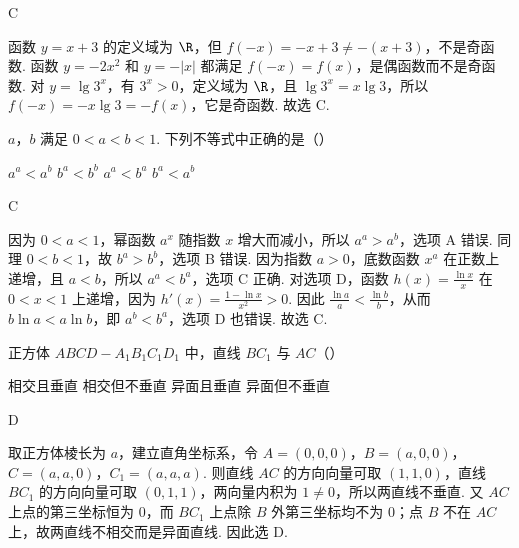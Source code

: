 \begin{answer}
C
\end{answer}

\begin{solution}
函数 \(y=x+3\) 的定义域为 \(\R\)，但 \(f(-x)=-x+3\neq-(x+3)\)，不是奇函数. 函数 \(y=-2x^2\) 和 \(y=-|x|\) 都满足 \(f(-x)=f(x)\)，是偶函数而不是奇函数. 对 \(y=\lg 3^x\)，有 \(3^x>0\)，定义域为 \(\R\)，且 \(\lg 3^x=x\lg3\)，所以 \(f(-x)=-x\lg3=-f(x)\)，它是奇函数. 故选 C.
\end{solution}

\begin{problem}

\(a\)，\(b\) 满足 \(0 < a < b < 1\). 下列不等式中正确的是（\quad）

\choices
    {\(a^a < a^b\)}
    {\(b^a < b^b\)}
    {\(a^a < b^a\)}
    {\(b^a < a^b\)}
\end{problem}

\begin{answer}
C
\end{answer}

\begin{solution}
因为 \(0<a<1\)，幂函数 \(a^x\) 随指数 \(x\) 增大而减小，所以 \(a^a>a^b\)，选项 A 错误. 同理 \(0<b<1\)，故 \(b^a>b^b\)，选项 B 错误. 因为指数 \(a>0\)，底数函数 \(x^a\) 在正数上递增，且 \(a<b\)，所以 \(a^a<b^a\)，选项 C 正确. 对选项 D，函数 \(h(x)=\frac{\ln x}{x}\) 在 \(0<x<1\) 上递增，因为 \(h'(x)=\frac{1-\ln x}{x^2}>0\). 因此 \(\frac{\ln a}{a}<\frac{\ln b}{b}\)，从而 \(b\ln a<a\ln b\)，即 \(a^b<b^a\)，选项 D 也错误. 故选 C.
\end{solution}

\begin{problem}

正方体 \(ABCD - A_{1}B_{1}C_{1}D_{1}\) 中，直线 \(BC_{1}\) 与 \(AC\)（\quad）

\choices
    {相交且垂直}
    {相交但不垂直}
    {异面且垂直}
    {异面但不垂直}
\end{problem}

\begin{answer}
D
\end{answer}

\begin{solution}
取正方体棱长为 \(a\)，建立直角坐标系，令 \(A=(0,0,0)\)，\(B=(a,0,0)\)，\(C=(a,a,0)\)，\(C_1=(a,a,a)\). 则直线 \(AC\) 的方向向量可取 \((1,1,0)\)，直线 \(BC_1\) 的方向向量可取 \((0,1,1)\)，两向量内积为 \(1\neq0\)，所以两直线不垂直. 又 \(AC\) 上点的第三坐标恒为 \(0\)，而 \(BC_1\) 上点除 \(B\) 外第三坐标均不为 \(0\)；点 \(B\) 不在 \(AC\) 上，故两直线不相交而是异面直线. 因此选 D.
\end{solution}

